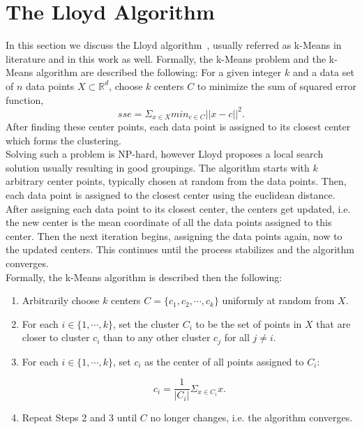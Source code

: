 \section{The Lloyd Algorithm}

In this section we discuss the Lloyd algorithm~\parencite{Lloyd82}, usually referred as k-Means in literature and in this work as well. Formally, the k-Means problem and the k-Means algorithm are described the following: For a given integer $k$ and a data set of $n$ data points $X \subset  \mathbb{R}^d$, choose $k$ centers $C$ to minimize the sum of squared error function,
\begin{equation*}
sse = \Sigma_{x \in X} min_{c \in C} ||x - c||^2.
\end{equation*}
After finding these center points, each data point is assigned to its closest center which forms the clustering. 
\\ 
Solving such a problem is NP-hard, however Lloyd proposes a local search solution usually resulting in good groupings. The algorithm starts with $k$ arbitrary center points, typically chosen at random from the data points. Then, each data point is assigned to the closest center using the euclidean distance. After assigning each data point to its closest center, the centers get updated, i.e. the new center is the mean coordinate of all the data points assigned to this center. Then the next iteration begins, assigning the data points again, now to the updated centers. This continues until the process stabilizes and the algorithm converges.
\\
Formally, the k-Means algorithm is described then the following:

\begin{enumerate} 
\item Arbitrarily choose $k$ centers $C = \{c_1, c_2, \cdots, c_k\}$ uniformly at random from $X$.
\item For each $i \in \{1, \cdots, k\}$, set the cluster $C_i$ to be the set of points in $X$ that are closer to cluster $c_i$ than to any other cluster $c_j$ for all $j \neq i$.
\item For each $i \in \{1, \cdots, k\}$, set $c_i$ as the center of all points assigned to $C_i$: 

\begin{equation*}
c_i = \frac{1}{|C_i|} \Sigma_{x \in C_i} x.
\end{equation*}

\item Repeat Steps 2 and 3 until $C$ no longer changes, i.e. the algorithm converges.
\end{enumerate}

